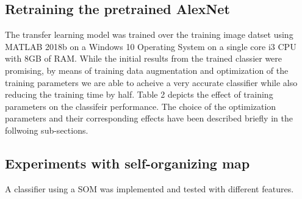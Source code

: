 \documentclass[doc/report.tex]{subfiles}
\begin{document}
\subsection{Retraining the pretrained AlexNet}
The transfer learning model was trained over the training image datset using MATLAB 2018b on a Windows 10 Operating System on a single core i3 CPU with 8GB of RAM. While the initial results from the trained classier were promising, by means of training data augmentation and optimization of the training parameters we are able to acheive a very accurate classifier while also reducing the training time by half. Table 2 depicts the effect of training parameters on the classifeir performance. The choice of the optimization parameters and their corresponding effects have been described briefly in the follwoing sub-sections.

\begin{table}[h]
\centering
\caption{Training Parameter Analysis}
\label{tab:my-table2}
\end{table}

\subsection{Experiments with self-organizing map}
A classifier using a SOM was implemented and tested with different features.
    
\end{document}
